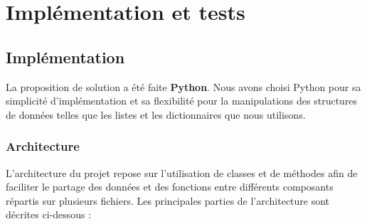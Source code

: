 \documentclass{rapportECL}
\begin{document}
\section{Implémentation et tests}

\subsection{Implémentation}

La proposition de solution a été faite \textbf{Python}. Nous avons choisi Python pour sa simplicité d'implémentation et sa flexibilité pour la manipulations des structures 
de données  telles que les listes et les dictionnaires que nous utilisons.

\subsubsection{Architecture}

L'architecture du projet repose sur l'utilisation de classes et de méthodes afin de faciliter le partage des données et des fonctions entre différents composants répartis sur plusieurs fichiers. Les principales parties de l'architecture sont décrites ci-dessous :
\end{document}

